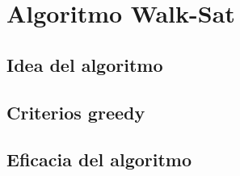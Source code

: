\documentclass[article]{llncs}
\begin{document}
\section{Algoritmo Walk-Sat}



\subsection{Idea del algoritmo}

\subsection{Criterios greedy}

\subsection{Eficacia del algoritmo}
\end{document}
